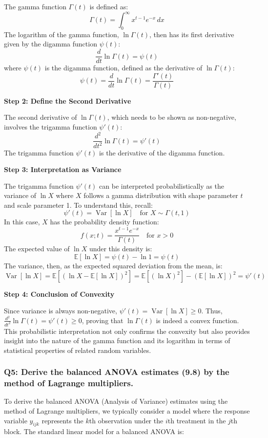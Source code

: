 \documentclass[8pt]{article}
\begin{document}
{The gamma function \(\Gamma(t)\) is defined as:
\[
\Gamma(t) = \int_0^\infty x^{t-1} e^{-x} \, dx
\]
The logarithm of the gamma function, \(\ln \Gamma(t)\), then has its first derivative given by the digamma function \(\psi(t)\):
\[
\frac{d}{dt} \ln \Gamma(t) = \psi(t)
\]
where \(\psi(t)\) is the digamma function, defined as the derivative of \(\ln \Gamma(t)\):
\[
\psi(t) = \frac{d}{dt} \ln \Gamma(t) = \frac{\Gamma'(t)}{\Gamma(t)}
\]

\textbf{Step 2: Define the Second Derivative}

The second derivative of \(\ln \Gamma(t)\), which needs to be shown as non-negative, involves the trigamma function \(\psi'(t)\):
\[
\frac{d^2}{dt^2} \ln \Gamma(t) = \psi'(t)
\]
The trigamma function \(\psi'(t)\) is the derivative of the digamma function.

\textbf{Step 3: Interpretation as Variance}

The trigamma function \(\psi'(t)\) can be interpreted probabilistically as the variance of \(\ln X\) where \(X\) follows a gamma distribution with shape parameter \(t\) and scale parameter 1. To understand this, recall:
\[
\psi'(t) = \operatorname{Var}[\ln X] \quad \text{for } X \sim \Gamma(t, 1)
\]
In this case, \(X\) has the probability density function:
\[
f(x; t) = \frac{x^{t-1} e^{-x}}{\Gamma(t)} \quad \text{for } x > 0
\]
The expected value of \(\ln X\) under this density is:
\[
\mathbb{E}[\ln X] = \psi(t) - \ln 1 = \psi(t)
\]
The variance, then, as the expected squared deviation from the mean, is:
\[
\operatorname{Var}[\ln X] = \mathbb{E}[(\ln X - \mathbb{E}[\ln X])^2] = \mathbb{E}[(\ln X)^2] - (\mathbb{E}[\ln X])^2 = \psi'(t)
\]

\textbf{Step 4: Conclusion of Convexity}

Since variance is always non-negative, \(\psi'(t) = \operatorname{Var}[\ln X] \geq 0\). Thus, \(\frac{d^2}{dt^2} \ln \Gamma(t) = \psi'(t) \geq 0\), proving that \(\ln \Gamma(t)\) is indeed a convex function. This probabilistic interpretation not only confirms the convexity but also provides insight into the nature of the gamma function and its logarithm in terms of statistical properties of related random variables.

\subsubsection*{Q5: Derive the balanced ANOVA estimates (9.8) by the method of Lagrange multipliers.}

To derive the balanced ANOVA (Analysis of Variance) estimates using the method of Lagrange multipliers, we typically consider a model where the response variable \(y_{ijk}\) represents the \(k\)th observation under the \(i\)th treatment in the \(j\)th block. The standard linear model for a balanced ANOVA is:

}
\end{document}
